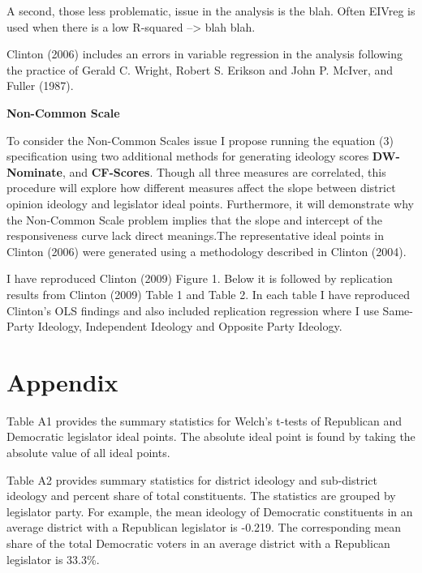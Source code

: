 \documentclass[10pt,letterpaper]{article}
\begin{document}
A second, those less problematic, issue in the \cite{Clinton2006} analysis is the blah. Often EIVreg is used when there is a low R-squared --> blah blah.

Clinton (2006) includes an errors in variable regression in the analysis following the practice of Gerald C. Wright, Robert S. Erikson and John P. McIver, and Fuller (1987).


\textbf{Non-Common Scale}

To consider the Non-Common Scales issue I propose running the equation (3) specification using two additional methods for generating ideology scores \textbf{DW-Nominate}, and \textbf{CF-Scores}. Though all three measures are correlated, this procedure will explore how different measures affect the slope between district opinion ideology and legislator ideal points. Furthermore, it will demonstrate why the Non-Common Scale problem implies that the slope and intercept of the responsiveness curve lack direct meanings.The representative ideal points in Clinton (2006) were generated using a methodology described in Clinton (2004).


I have reproduced Clinton (2009) Figure 1. Below it is followed by replication results from Clinton (2009) Table 1 and Table 2. In each table I have reproduced Clinton's OLS findings and also included replication regression where I use Same-Party Ideology, Independent Ideology and Opposite Party Ideology.



\newpage

\newpage



\newpage
\section{Appendix} 
\setcounter{table}{0}
\renewcommand{\thetable}{A\arabic{table}}
\setcounter{figure}{0}
\renewcommand{\thefigure}{A\arabic{figure}}

%
Table A1 provides the summary statistics for Welch's t-tests of Republican and Democratic legislator ideal points. The absolute ideal point is found by taking the absolute value of all ideal points.
 

Table A2 provides summary statistics for district ideology and sub-district ideology and percent share of total constituents. The statistics are grouped by legislator party. For example, the mean ideology of Democratic constituents in an average district with a Republican legislator is -0.219. The corresponding mean share of the total Democratic voters in an average district with a Republican legislator is 33.3\%.
 
\end{document}
